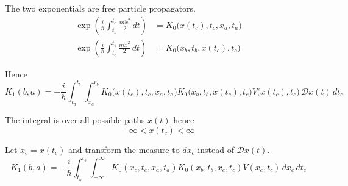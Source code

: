 The two exponentials are free particle propagators.
\begin{align*}
\exp\left(\frac{i}{\hbar}\int_{t_a}^{t_c}\frac{m\dot x^2}{2}\,dt\right)
&=K_0\bigl(x(t_c),t_c,x_a,t_a\bigr)
\\
\exp\left(\frac{i}{\hbar}\int_{t_c}^{t_b}\frac{m\dot x^2}{2}\,dt\right)
&=K_0\bigl(x_b,t_b,x(t_c),t_c\bigr)
\end{align*}

Hence
\begin{equation*}
K_1(b,a)=-\frac{i}{\hbar}\int_{t_a}^{t_b}\int_{x_a}^{x_b}
K_0\bigl(x(t_c),t_c,x_a,t_a\bigr)K_0\bigl(x_b,t_b,x(t_c),t_c\bigr)
V\bigl(x(t_c),t_c\bigr)
\,\mathscr Dx(t)\,dt_c
\end{equation*}

The integral is over all possible paths $x(t)$ hence
\begin{equation*}
-\infty<x(t_c)<\infty
\end{equation*}

Let $x_c=x(t_c)$ and transform the measure to $dx_c$ instead of $\mathscr Dx(t)$.
\begin{equation*}
K_1(b,a)=-\frac{i}{\hbar}\int_{t_a}^{t_b}\int_{-\infty}^\infty
K_0(x_c,t_c,x_a,t_a)K_0(x_b,t_b,x_c,t_c)
V(x_c,t_c)
\,dx_c\,dt_c
\end{equation*}


